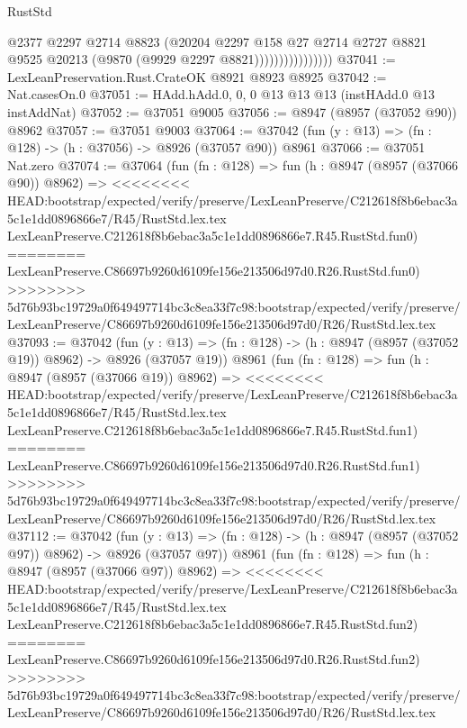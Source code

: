 \begin{lexlean}{RustStd}
\begin{coremodule}
{\begin{coremodule}
{{{{{{{{{{{{{{{{{{{{{{{{{{{{{{{{{{{{{{{                              @2377
                              @2297
                              @2714
                              @8823
                              (@20204
                                @2297
                                @158
                                @27
                                @2714
                                @2727
                                @8821
                                @9525
                                @20213
                                (@9870 (@9929 @2297 @8821))))))))))))))))
@37041 := LexLeanPreservation.Rust.CrateOK @8921 @8923 @8925
@37042 := Nat.casesOn.{0}
@37051 := HAdd.hAdd.{0, 0, 0} @13 @13 @13 (instHAdd.{0} @13 instAddNat)
@37052 := @37051 @9005
@37056 := @8947 (@8957 (@37052 @90)) @8962
@37057 := @37051 @9003
@37064 := @37042 (fun (y : @13) => (fn : @128) -> (h : @37056) -> @8926 (@37057 @90)) @8961
@37066 := @37051 Nat.zero
@37074 := @37064
    (fun (fn : @128) =>
    fun (h : @8947 (@8957 (@37066 @90)) @8962) =>
<<<<<<<< HEAD:bootstrap/expected/verify/preserve/LexLeanPreserve/C212618f8b6ebac3a5c1e1dd0896866e7/R45/RustStd.lex.tex
    LexLeanPreserve.C212618f8b6ebac3a5c1e1dd0896866e7.R45.RustStd.fun0)
========
    LexLeanPreserve.C86697b9260d6109fe156e213506d97d0.R26.RustStd.fun0)
>>>>>>>> 5d76b93bc19729a0f649497714bc3c8ea33f7c98:bootstrap/expected/verify/preserve/LexLeanPreserve/C86697b9260d6109fe156e213506d97d0/R26/RustStd.lex.tex
@37093 := @37042
    (fun (y : @13) => (fn : @128) -> (h : @8947 (@8957 (@37052 @19)) @8962) -> @8926 (@37057 @19))
    @8961
    (fun (fn : @128) =>
    fun (h : @8947 (@8957 (@37066 @19)) @8962) =>
<<<<<<<< HEAD:bootstrap/expected/verify/preserve/LexLeanPreserve/C212618f8b6ebac3a5c1e1dd0896866e7/R45/RustStd.lex.tex
    LexLeanPreserve.C212618f8b6ebac3a5c1e1dd0896866e7.R45.RustStd.fun1)
========
    LexLeanPreserve.C86697b9260d6109fe156e213506d97d0.R26.RustStd.fun1)
>>>>>>>> 5d76b93bc19729a0f649497714bc3c8ea33f7c98:bootstrap/expected/verify/preserve/LexLeanPreserve/C86697b9260d6109fe156e213506d97d0/R26/RustStd.lex.tex
@37112 := @37042
    (fun (y : @13) => (fn : @128) -> (h : @8947 (@8957 (@37052 @97)) @8962) -> @8926 (@37057 @97))
    @8961
    (fun (fn : @128) =>
    fun (h : @8947 (@8957 (@37066 @97)) @8962) =>
<<<<<<<< HEAD:bootstrap/expected/verify/preserve/LexLeanPreserve/C212618f8b6ebac3a5c1e1dd0896866e7/R45/RustStd.lex.tex
    LexLeanPreserve.C212618f8b6ebac3a5c1e1dd0896866e7.R45.RustStd.fun2)
========
    LexLeanPreserve.C86697b9260d6109fe156e213506d97d0.R26.RustStd.fun2)
>>>>>>>> 5d76b93bc19729a0f649497714bc3c8ea33f7c98:bootstrap/expected/verify/preserve/LexLeanPreserve/C86697b9260d6109fe156e213506d97d0/R26/RustStd.lex.tex
}}}}}}}}}}}}}}}}}}}}}}}}}}}}}}}}}}}}}}}
\end{coremodule}}
\end{coremodule}
\end{lexlean}

